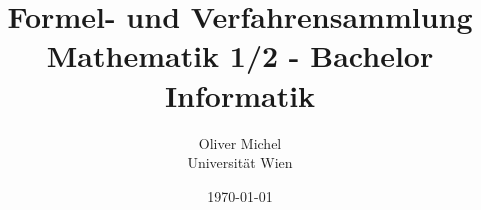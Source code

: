 \documentclass[a4paper,11pt]{article}
\title{Formel- und Verfahrensammlung\\Mathematik 1/2 - Bachelor Informatik}
\author{Oliver Michel\\Universität Wien}
\date{\today}
\begin{document}
		
	\maketitle
	\tableofcontents

	\pagebreak
	
	\pagebreak
	
	\pagebreak
	
	\pagebreak
	
	\pagebreak
	
	\pagebreak
	
	\pagebreak
	
\end{document}
